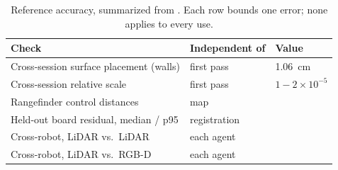 \begin{table}[t]
\centering
\caption{Reference accuracy, summarized from \cite{scoop_testbed}.
Each row bounds one error; none applies to every use.}
\label{tab:gt_summary}
\footnotesize
\begin{tabular}{@{}lll@{}}
\toprule
Check & Independent of & Value \\
\midrule
Cross-session surface placement (walls) & first pass & \SI{1.06}{\centi\metre} \\
Cross-session relative scale & first pass & $1-2\times10^{-5}$ \\
Rangefinder control distances & map & \todo{} \\
Held-out board residual, median / p95 & registration & \todo{} \\
Cross-robot, LiDAR vs.\ LiDAR & each agent & \todo{} \\
Cross-robot, LiDAR vs.\ RGB-D & each agent & \todo{} \\
\bottomrule
\end{tabular}
\end{table}
